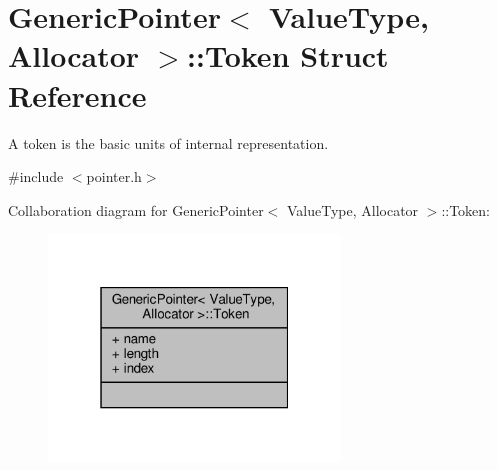 \hypertarget{structGenericPointer_1_1Token}{}\section{Generic\+Pointer$<$ Value\+Type, Allocator $>$\+:\+:Token Struct Reference}
\label{structGenericPointer_1_1Token}


A token is the basic units of internal representation.  




{\ttfamily \#include $<$pointer.\+h$>$}



Collaboration diagram for Generic\+Pointer$<$ Value\+Type, Allocator $>$\+:\+:Token\+:
\nopagebreak
\begin{figure}[H]
\begin{center}
\leavevmode
\includegraphics[width=220pt]{structGenericPointer_1_1Token__coll__graph}
\end{center}
\end{figure}
